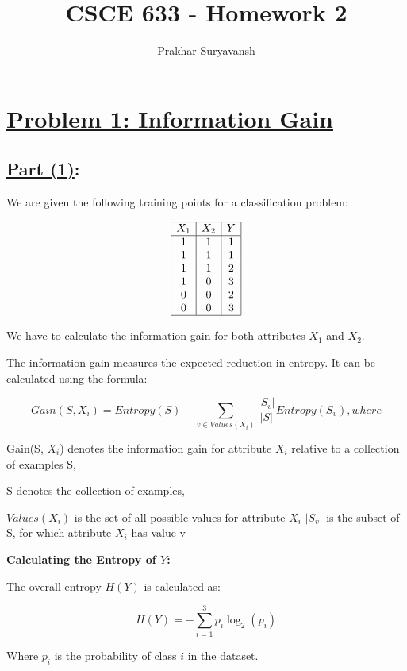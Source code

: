 \documentclass[12pt]{article}
\title{CSCE 633 - Homework 2}
\author{Prakhar Suryavansh}
\date{}
\begin{document}
\maketitle

\section*{\underline{Problem 1:  Information Gain}}

\subsection*{\underline{Part (1)}:}

We are given the following training points for a classification problem:

\[
  \begin{array}{|c|c|c|}
    \hline
    X_1 & X_2 & Y \\
    \hline
    1   & 1   & 1 \\
    1   & 1   & 1 \\
    1   & 1   & 2 \\
    1   & 0   & 3 \\
    0   & 0   & 2 \\
    0   & 0   & 3 \\
    \hline
  \end{array}
\]

We have to calculate the information gain for both attributes $X_1$ and $X_2$.

The information gain measures the expected reduction in entropy. It can be calculated using the formula:

\[
  Gain(S, X_i) = Entropy(S) - \sum_{v \in Values(X_i)}^{} \frac{|S_v|}{|S|} Entropy(S_v) , where
\]

Gain(S, $X_i$) denotes the information gain for attribute $X_i$ relative to a collection of examples S,

S denotes the collection of examples,

$Values(X_i)$ is the set of all possible values for attribute $X_i$
$|S_v|$ is the subset of S, for which attribute $X_i$ has value v


\textbf{Calculating the Entropy of $Y$:}

The overall entropy $H(Y)$ is calculated as:

\[
  H(Y) = - \sum_{i=1}^{3} p_i \log_2(p_i)
\]

Where $p_i$ is the probability of class $i$ in the dataset.
\end{document}

